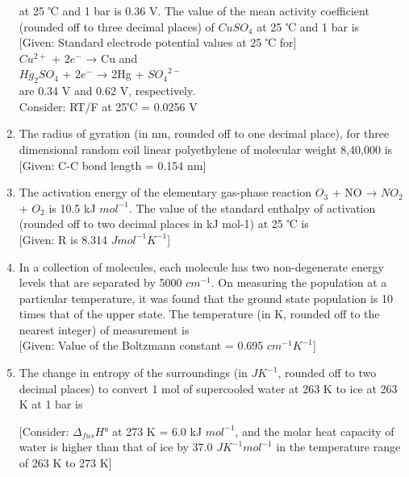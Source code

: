 \documentclass[12pt]{article}
\begin{document}
\begin{enumerate}
at 25 ℃ and 1 bar is 0.36 V. The value of the mean activity coefficient (rounded
off to three decimal places) of $CuSO_4$ at 25 ℃ and 1 bar is\\ 

[Given: Standard electrode potential values at 25 ℃ for] \\

$Cu^{2+}$ + $2e^{-}$ → Cu and \\

$Hg_2SO_4$ + 2$e^{-}$ → 2Hg + ${SO_4}^{2-}$ \\

are 0.34 V and 0.62 V, respectively. \\

Consider: RT/F at 25℃ = 0.0256 V



\item The radius of gyration (in nm, rounded off to one decimal place), for three
dimensional random coil linear polyethylene of molecular weight 8,40,000 is\\

[Given: C-C bond length = 0.154 nm]

\item The activation energy of the elementary gas-phase reaction $O_3$ + NO → $NO_2$ + $O_2$
is 10.5 kJ $mol^{-1}$. The value of the standard enthalpy of activation (rounded off to
two decimal places in kJ mol-1) at 25 ℃ is\\

[Given: R is 8.314 $J mol^{-1} K^{-1}$]

\item In a collection of molecules, each molecule has two non-degenerate energy levels
that are separated by 5000 $cm^{-1}$. On measuring the population at a particular
temperature, it was found that the ground state population is 10 times that of the
upper state. The temperature (in K, rounded off to the nearest integer) of
measurement is\\ 

[Given: Value of the Boltzmann constant = 0.695 $cm^{-1}K^{-1}$]

\item The change in entropy of the surroundings (in $J K^{-1}$, rounded off to two decimal
places) to convert 1 mol of supercooled water at 263 K to ice at 263 K at 1 bar is


[Consider: $\Delta_{fus}H°$ at 273 K = 6.0 kJ $mol^{-1}$, and the molar heat capacity of water is
higher than that of ice by 37.0 $J K^{-1} mol^{-1}$ in the temperature range of 263 K to
273 K]


\end{enumerate}
\end{document}
